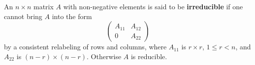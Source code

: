 An $n \times n$ matrix $A$ with non-negative elements is said to be \textbf{irreducible} if one cannot bring $A$ into the form
$$\begin{pmatrix} A_{11} & A_{12} \\ 0 & A_{22} \end{pmatrix}$$
by a consistent relabeling of rows and columns, where $A_{11}$ is $r \times r$, $1 \leq r < n$, and $A_{22}$ is $(n-r) \times (n-r)$. Otherwise $A$ is reducible.
